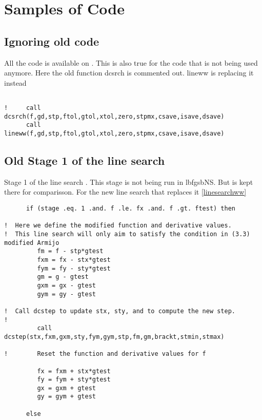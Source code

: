 
\chapter{Samples of Code} %

\label{AppendixA} %


\section{Ignoring old code}
All the code is available on \citep{lbfgsbNS} \label{ignoredcode}. This is also true for the code that is not being used anymore.  Here the old function dcsrch is commented out. lineww is replacing it instead
\begin{lstlisting}

!     call dcsrch(f,gd,stp,ftol,gtol,xtol,zero,stpmx,csave,isave,dsave)
      call lineww(f,gd,stp,ftol,gtol,xtol,zero,stpmx,csave,isave,dsave)

\end{lstlisting}

\section{Old Stage 1 of the line search}
Stage 1 of the line search\citep{lbfgsbsoftware} \label{stage1}. This stage is not being run in lbfgsbNS. But is kept there for comparisson. For the new line search that replaces it \ref{linesearchww}
\begin{lstlisting}
      if (stage .eq. 1 .and. f .le. fx .and. f .gt. ftest) then

!  Here we define the modified function and derivative values.
!  This line search will only aim to satisfy the condition in (3.3) modified Armijo
         fm = f - stp*gtest
         fxm = fx - stx*gtest
         fym = fy - sty*gtest
         gm = g - gtest
         gxm = gx - gtest
         gym = gy - gtest

!  Call dcstep to update stx, sty, and to compute the new step.
!
         call dcstep(stx,fxm,gxm,sty,fym,gym,stp,fm,gm,brackt,stmin,stmax)

!        Reset the function and derivative values for f

         fx = fxm + stx*gtest
         fy = fym + sty*gtest
         gx = gxm + gtest
         gy = gym + gtest

      else
\end{lstlisting}

